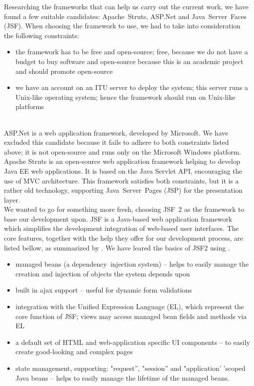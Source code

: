 \noindent Researching the frameworks that can help us carry out the current work, we have found a few suitable candidates: Apache~Struts, ASP.Net and Java~Server~Faces (JSF). When choosing the framework to use, we had to take into consideration the following constraints:
\begin{itemize}
  \item the framework has to be free and open-source; free, because we do not
  have a budget to buy software and open-source because this is an academic
  project and should promote open-source
  \item we have an account on an ITU server to deploy the system; this
  server runs a Unix-like operating system; hence the framework should run on
  Unix-like platforms
\end{itemize}
\\

\noindent ASP.Net is a web application framework, developed by Microsoft. We have excluded this candidate because it fails to adhere to both constraints listed above; it is not open-source and runs only on the Microsoft Windows platform.
\\

\noindent Apache Struts is an open-source web application framework helping to develop Java EE web applications. It is based on the Java Servlet API, encouraging the use of MVC architecture. This framework satisfies both constraints, but it is a rather old technology, supporting Java~Server~Pages (JSP) for the presentation layer.
\\

\noindent We wanted to go for something more fresh, choosing JSF~2 as the framework to base our development upon. JSF is a Java-based web application framework which simplifies the development integration of web-based user interfaces. The core features, together with the help they offer for our development process, are listed bellow, as summarized by \cite{wiki}. We have leared the basics of JSF2 using \cite{Geary:3}.
\begin{itemize}
  \item managed beans (a dependency~injection system) -- helps to easily manage the creation and injection of objects the system depends upon
  \item built in ajax support -- useful for dynamic form validations
  \item integration with the Unified Expression Language (EL), which represent the core function of JSF; views may access managed bean fields and methods via EL
  \item a default set of HTML and web-application specific UI components -- to easily create good-looking and complex pages
  \item state management, supporting: "request'', "session'' and "application' 'scoped Java beans -- helps to easily manage the lifetime of the managed beans.
\end{itemize}
\\


